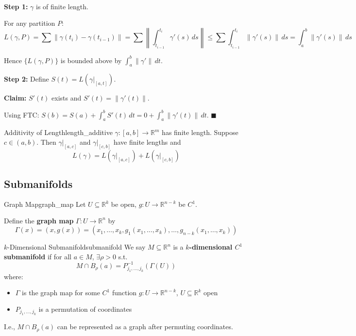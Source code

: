 \documentclass[11pt, letterpaper, openany]{book}
\renewenvironment{proof}[1][\proofname]{%
  \tcolorbox[blanker, breakable, left=1em,
    before skip=1em, after skip=1em,
    borderline west={2pt}{0pt}{MagicTeal!50},
    colback=MagicCream,
    before upper={\textcolor{MagicTeal}{\sffamily\bfseries #1.}\space}
  ]%
}{%
  \hfill\textcolor{MagicTeal}{\ensuremath{\blacksquare}}\endtcolorbox%
}
\begin{document}
\begin{proof}[Sketch]
\textbf{Step 1:} $\gamma$ is of finite length.

For any partition $P$:
\[L(\gamma, P) = \sum \|\gamma(t_i) - \gamma(t_{i-1})\| = \sum \left\|\int_{t_{i-1}}^{t_i} \gamma'(s) \, ds\right\| \leq \sum \int_{t_{i-1}}^{t_i} \|\gamma'(s)\| \, ds = \int_a^b \|\gamma'(s)\| \, ds\]

Hence $\{L(\gamma, P)\}$ is bounded above by $\int_a^b \|\gamma'\| \, dt$.

\textbf{Step 2:} Define $S(t) = L(\gamma|_{[a,t]})$.

\textbf{Claim:} $S'(t)$ exists and $S'(t) = \|\gamma'(t)\|$.

Using FTC: $S(b) = S(a) + \int_a^b S'(t) \, dt = 0 + \int_a^b \|\gamma'(t)\| \, dt$.
\end{proof}

\begin{lem}{Additivity of Length}{length_additive}
$\gamma: [a,b] \to \mathbb{R}^m$ has finite length. Suppose $c \in (a,b)$. Then $\gamma|_{[a,c]}$ and $\gamma|_{[c,b]}$ have finite lengths and
\[L(\gamma) = L(\gamma|_{[a,c]}) + L(\gamma|_{[c,b]})\]
\end{lem}

\subsection{Submanifolds}

\begin{defn}{Graph Map}{graph_map}
Let $U \subseteq \mathbb{R}^k$ be open, $g: U \to \mathbb{R}^{n-k}$ be $C^1$.

Define the \textbf{graph map} $\Gamma: U \to \mathbb{R}^n$ by
\[\Gamma(x) = (x, g(x)) = (x_1, \ldots, x_k, g_1(x_1, \ldots, x_k), \ldots, g_{n-k}(x_1, \ldots, x_k))\]
\end{defn}

\begin{defn}{$k$-Dimensional Submanifold}{submanifold}
We say $M \subseteq \mathbb{R}^n$ is a \textbf{$k$-dimensional $C^1$ submanifold} if for all $a \in M$, $\exists \rho > 0$ s.t.
\[M \cap B_\rho(a) = P_{j_1, \ldots, j_k}^{-1}(\Gamma(U))\]
where:
\begin{itemize}
    \item $\Gamma$ is the graph map for some $C^1$ function $g: U \to \mathbb{R}^{n-k}$, $U \subseteq \mathbb{R}^k$ open
    \item $P_{j_1, \ldots, j_k}$ is a permutation of coordinates
\end{itemize}
I.e., $M \cap B_\rho(a)$ can be represented as a graph after permuting coordinates.
\end{defn}
\end{document}

